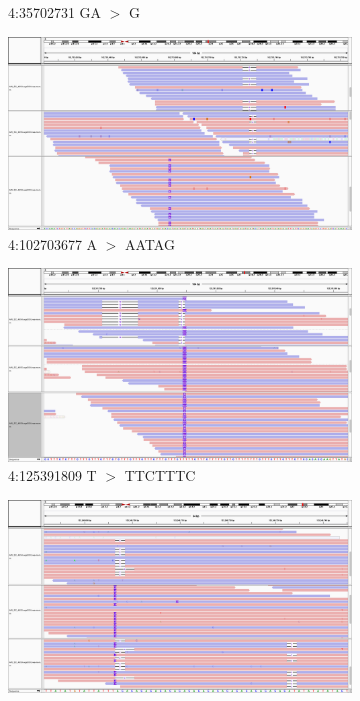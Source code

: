 \documentclass{article}
\begin{document}
\begin{landscape}
\begin{figure}[ht!]
\begin{subfigure}[b]{0.33\textwidth}
        \caption{\tiny 4:35702731 GA $>$ G}
    \end{subfigure}
    \begin{subfigure}[b]{0.33\textwidth}
        \includegraphics[width=\textwidth]{figures/4_102703677_AATAGins}
        \caption{\tiny 4:102703677 A $>$ AATAG}
    \end{subfigure}
    \begin{subfigure}[b]{0.33\textwidth}
        \includegraphics[width=\textwidth]{figures/4_125391809_TTCTTTCins}
        \caption{\tiny 4:125391809 T $>$ TTCTTTC}
    \end{subfigure}
    \begin{subfigure}[b]{0.33\textwidth}
        \includegraphics[width=\textwidth]{figures/5_153246696_TACACins_153246732_CATdel}

\end{subfigure}
\end{figure}
\end{landscape}
\end{document}
